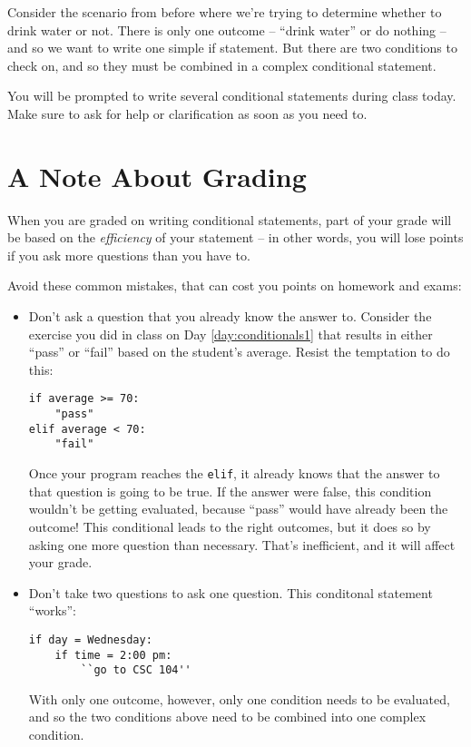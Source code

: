 Consider the scenario from before where we're trying to determine whether to drink water or not.  There is only one outcome -- ``drink water'' or do nothing -- and so we want to write one simple if statement.  But there are two conditions to check on, and so they must be combined in a complex conditional statement.

You will be prompted to write several conditional statements during class today.  Make sure to ask for help or clarification as soon as you need to.

\section{A Note About Grading}

When you are graded on writing conditional statements, part of your grade will be based on the \textit{efficiency} of your statement -- in other words, you will lose points if you ask more questions than you have to.

Avoid these common mistakes, that can cost you points on homework and exams:
\begin{itemize}
    \item Don't ask a question that you already know the answer to.  Consider the exercise you did in class on Day \ref{day:conditionals1} that results in either ``pass'' or ``fail'' based on the student's average.  Resist the temptation to do this:
    \begin{verbatim}
if average >= 70:
    "pass"
elif average < 70:
    "fail"
    \end{verbatim}
    Once your program reaches the \texttt{elif}, it already knows that the answer to that question is going to be true.  If the answer were false, this condition wouldn't be getting evaluated, because ``pass'' would have already been the outcome!  This conditional leads to the right outcomes, but it does so by asking one more question than necessary.  That's inefficient, and it will affect your grade.

    \item Don't take two questions to ask one question.  This conditonal statement ``works'':
    \begin{verbatim}
if day = Wednesday:
    if time = 2:00 pm:
        ``go to CSC 104''
    \end{verbatim}
    With only one outcome, however, only one condition needs to be evaluated, and so the two conditions above need to be combined into one complex condition.
\end{itemize}